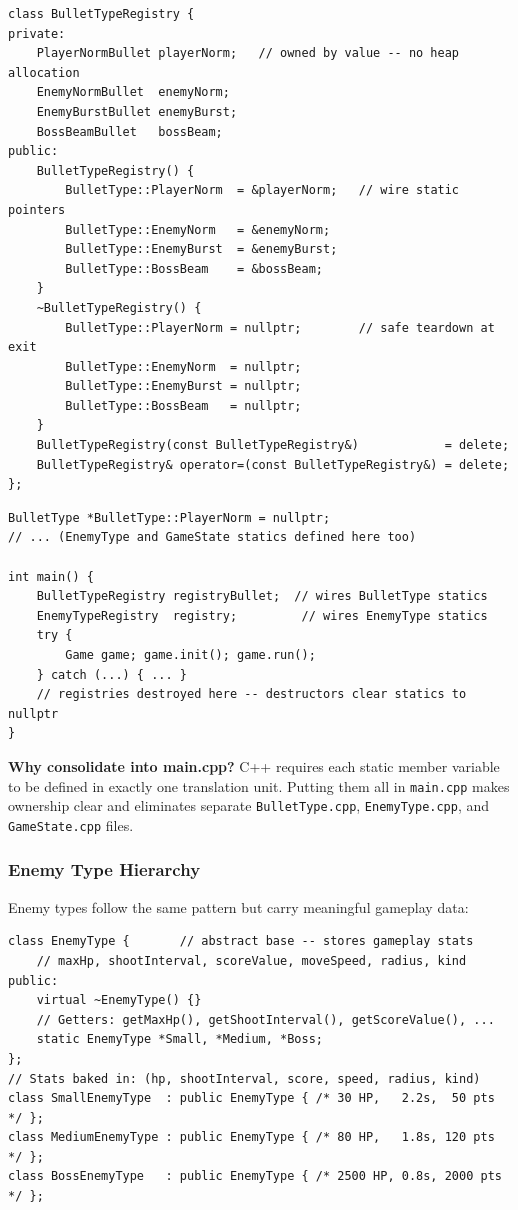 \documentclass[11pt]{article}
\begin{document}
\begin{lstlisting}[caption={BulletTypeRegistry --- RAII singleton manager (BulletType.h)}]
class BulletTypeRegistry {
private:
    PlayerNormBullet playerNorm;   // owned by value -- no heap allocation
    EnemyNormBullet  enemyNorm;
    EnemyBurstBullet enemyBurst;
    BossBeamBullet   bossBeam;
public:
    BulletTypeRegistry() {
        BulletType::PlayerNorm  = &playerNorm;   // wire static pointers
        BulletType::EnemyNorm   = &enemyNorm;
        BulletType::EnemyBurst  = &enemyBurst;
        BulletType::BossBeam    = &bossBeam;
    }
    ~BulletTypeRegistry() {
        BulletType::PlayerNorm = nullptr;        // safe teardown at exit
        BulletType::EnemyNorm  = nullptr;
        BulletType::EnemyBurst = nullptr;
        BulletType::BossBeam   = nullptr;
    }
    BulletTypeRegistry(const BulletTypeRegistry&)            = delete;
    BulletTypeRegistry& operator=(const BulletTypeRegistry&) = delete;
};
\end{lstlisting}

\begin{lstlisting}[caption={Static definitions and registry activation in main.cpp}]
BulletType *BulletType::PlayerNorm = nullptr;
// ... (EnemyType and GameState statics defined here too)

int main() {
    BulletTypeRegistry registryBullet;  // wires BulletType statics
    EnemyTypeRegistry  registry;         // wires EnemyType statics
    try {
        Game game; game.init(); game.run();
    } catch (...) { ... }
    // registries destroyed here -- destructors clear statics to nullptr
}
\end{lstlisting}

\textbf{Why consolidate into main.cpp?} C++ requires each static member
variable to be defined in exactly one translation unit. Putting them all in
\texttt{main.cpp} makes ownership clear and eliminates separate
\texttt{BulletType.cpp}, \texttt{EnemyType.cpp}, and \texttt{GameState.cpp}
files.

\subsubsection{Enemy Type Hierarchy}

Enemy types follow the same pattern but carry meaningful gameplay data:

\begin{lstlisting}[caption={EnemyType hierarchy skeleton (EnemyType.h)}]
class EnemyType {       // abstract base -- stores gameplay stats
    // maxHp, shootInterval, scoreValue, moveSpeed, radius, kind
public:
    virtual ~EnemyType() {}
    // Getters: getMaxHp(), getShootInterval(), getScoreValue(), ...
    static EnemyType *Small, *Medium, *Boss;
};
// Stats baked in: (hp, shootInterval, score, speed, radius, kind)
class SmallEnemyType  : public EnemyType { /* 30 HP,   2.2s,  50 pts  */ };
class MediumEnemyType : public EnemyType { /* 80 HP,   1.8s, 120 pts  */ };
class BossEnemyType   : public EnemyType { /* 2500 HP, 0.8s, 2000 pts */ };
\end{lstlisting}
\end{document}
